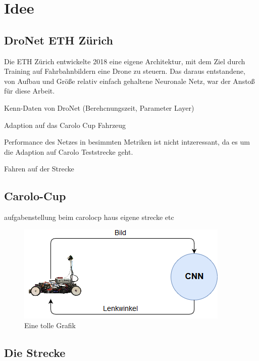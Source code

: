 %
\chapter{Idee}

\section{DroNet ETH Zürich}

Die ETH Zürich entwickelte 2018 eine eigene Architektur, mit dem Ziel durch Training auf Fahrbahnbildern eine Drone zu steuern. 
Das daraus entstandene, von Aufbau und Größe relativ einfach gehaltene Neuronale Netz, war der Anstoß für diese Arbeit. 

Kenn-Daten von DroNet (Berehcnungszeit, Parameter Layer)


Adaption auf das Carolo Cup Fahrzeug

Performance des Netzes in besimmten Metriken ist nicht intzeressant, da es um die Adaption auf Carolo Teststrecke geht.

Fahren auf der Strecke 


\section{Carolo-Cup}
aufgabenstellung beim carolocp
haus eigene strecke etc

\begin{figure}
	\centering
	\includegraphics[scale=0.7]{figures/Aufbau.png}
	\caption{Eine tolle Grafik}
	\label{img:toll ist das}
\end{figure}

\section{Die Strecke}

